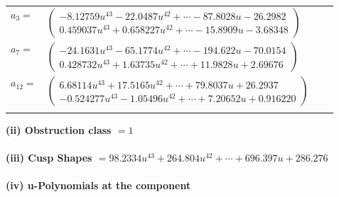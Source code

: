 \documentclass[1p]{elsarticle_modified}
\theoremstyle{definition}
\begin{document}
\begin{tabular}{m{7pt} m{180pt} m{7pt} m{180pt} }
\flushright $a_{3}=$&$\begin{pmatrix}-8.12759 u^{43}-22.0487 u^{42}+\cdots-87.8028 u-26.2982\\0.459037 u^{43}+0.658227 u^{42}+\cdots-15.8909 u-3.68348\end{pmatrix}$ \\
\flushright $a_{7}=$&$\begin{pmatrix}-24.1631 u^{43}-65.1774 u^{42}+\cdots-194.622 u-70.0154\\0.428732 u^{43}+1.63735 u^{42}+\cdots+11.9828 u+2.69676\end{pmatrix}$ \\
\flushright $a_{12}=$&$\begin{pmatrix}6.68114 u^{43}+17.5165 u^{42}+\cdots+79.8037 u+26.2937\\-0.524277 u^{43}-1.05496 u^{42}+\cdots+7.20652 u+0.916220\end{pmatrix}$\\&\end{tabular}
\flushleft \textbf{(ii) Obstruction class $= 1$}\\~\\
\flushleft \textbf{(iii) Cusp Shapes $= 98.2334 u^{43}+264.804 u^{42}+\cdots+696.397 u+286.276$}\\~\\
\newpage\renewcommand{\arraystretch}{1}
\flushleft \textbf{(iv) u-Polynomials at the component}\newline \\
\end{document}
